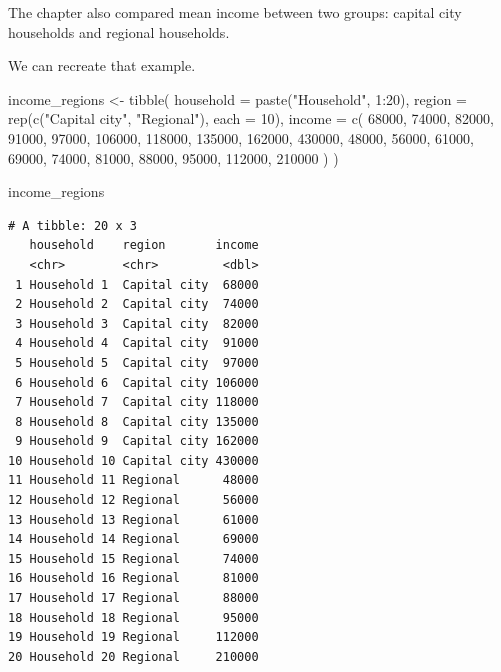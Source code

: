 \documentclass[
  letterpaper,
  DIV=11,
  numbers=noendperiod]{scrreprt}
\newenvironment{Shaded}{\begin{snugshade}}{\end{snugshade}}
\newcommand{\AttributeTok}[1]{\textcolor[rgb]{0.40,0.45,0.13}{#1}}
\newcommand{\DecValTok}[1]{\textcolor[rgb]{0.68,0.00,0.00}{#1}}
\newcommand{\FunctionTok}[1]{\textcolor[rgb]{0.28,0.35,0.67}{#1}}
\newcommand{\NormalTok}[1]{\textcolor[rgb]{0.00,0.23,0.31}{#1}}
\newcommand{\OtherTok}[1]{\textcolor[rgb]{0.00,0.23,0.31}{#1}}
\newcommand{\SpecialCharTok}[1]{\textcolor[rgb]{0.37,0.37,0.37}{#1}}
\newcommand{\StringTok}[1]{\textcolor[rgb]{0.13,0.47,0.30}{#1}}
\begin{document}
The chapter also compared mean income between two groups: capital city
households and regional households.

We can recreate that example.

\begin{Shaded}
\begin{Highlighting}[]
\NormalTok{income\_regions }\OtherTok{\textless{}{-}} \FunctionTok{tibble}\NormalTok{(}
  \AttributeTok{household =} \FunctionTok{paste}\NormalTok{(}\StringTok{"Household"}\NormalTok{, }\DecValTok{1}\SpecialCharTok{:}\DecValTok{20}\NormalTok{),}
  \AttributeTok{region =} \FunctionTok{rep}\NormalTok{(}\FunctionTok{c}\NormalTok{(}\StringTok{"Capital city"}\NormalTok{, }\StringTok{"Regional"}\NormalTok{), }\AttributeTok{each =} \DecValTok{10}\NormalTok{),}
  \AttributeTok{income =} \FunctionTok{c}\NormalTok{(}
    \DecValTok{68000}\NormalTok{, }\DecValTok{74000}\NormalTok{, }\DecValTok{82000}\NormalTok{, }\DecValTok{91000}\NormalTok{, }\DecValTok{97000}\NormalTok{,}
    \DecValTok{106000}\NormalTok{, }\DecValTok{118000}\NormalTok{, }\DecValTok{135000}\NormalTok{, }\DecValTok{162000}\NormalTok{, }\DecValTok{430000}\NormalTok{,}
    \DecValTok{48000}\NormalTok{, }\DecValTok{56000}\NormalTok{, }\DecValTok{61000}\NormalTok{, }\DecValTok{69000}\NormalTok{, }\DecValTok{74000}\NormalTok{,}
    \DecValTok{81000}\NormalTok{, }\DecValTok{88000}\NormalTok{, }\DecValTok{95000}\NormalTok{, }\DecValTok{112000}\NormalTok{, }\DecValTok{210000}
\NormalTok{  )}
\NormalTok{)}

\NormalTok{income\_regions}
\end{Highlighting}
\end{Shaded}

\begin{verbatim}
# A tibble: 20 x 3
   household    region       income
   <chr>        <chr>         <dbl>
 1 Household 1  Capital city  68000
 2 Household 2  Capital city  74000
 3 Household 3  Capital city  82000
 4 Household 4  Capital city  91000
 5 Household 5  Capital city  97000
 6 Household 6  Capital city 106000
 7 Household 7  Capital city 118000
 8 Household 8  Capital city 135000
 9 Household 9  Capital city 162000
10 Household 10 Capital city 430000
11 Household 11 Regional      48000
12 Household 12 Regional      56000
13 Household 13 Regional      61000
14 Household 14 Regional      69000
15 Household 15 Regional      74000
16 Household 16 Regional      81000
17 Household 17 Regional      88000
18 Household 18 Regional      95000
19 Household 19 Regional     112000
20 Household 20 Regional     210000
\end{verbatim}
\end{document}
